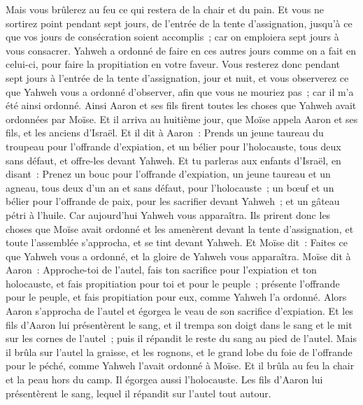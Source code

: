 \begin{multicols}{2}
Mais vous brûlerez au feu ce qui restera de la chair et du pain.
Et vous ne sortirez point pendant sept jours, de l'entrée de la tente d'assignation, jusqu'à ce que vos jours de consécration soient accomplis~; car on emploiera sept jours à vous consacrer.
Yahweh a ordonné de faire en ces autres jours comme on a fait en celui-ci, pour faire la propitiation en votre faveur.
Vous resterez donc pendant sept jours à l'entrée de la tente d'assignation, jour et nuit, et vous observerez ce que Yahweh vous a ordonné d'observer, afin que vous ne mouriez pas~; car il m'a été ainsi ordonné.
Ainsi Aaron et ses fils firent toutes les choses que Yahweh avait ordonnées par Moïse.
\VerseOne{}Et il arriva au huitième jour, que Moïse appela Aaron et ses fils, et les anciens d'Israël.
Et il dit à Aaron~: Prends un jeune taureau du troupeau pour l'offrande d'expiation, et un bélier pour l'holocauste, tous deux sans défaut, et offre-les devant Yahweh.
Et tu parleras aux enfants d'Israël, en disant~: Prenez un bouc pour l'offrande d'expiation, un jeune taureau et un agneau, tous deux d'un an et sans défaut, pour l'holocauste~;
un bœuf et un bélier pour l'offrande de paix, pour les sacrifier devant Yahweh~; et un gâteau pétri à l'huile. Car aujourd'hui Yahweh vous apparaîtra.
Ils prirent donc les choses que Moïse avait ordonné et les amenèrent devant la tente d'assignation, et toute l'assemblée s'approcha, et se tint devant Yahweh.
Et Moïse dit~: Faites ce que Yahweh vous a ordonné, et la gloire de Yahweh vous apparaîtra.
Moïse dit à Aaron~: Approche-toi de l'autel, fais ton sacrifice pour l'expiation et ton holocauste, et fais propitiation pour toi et pour le peuple~; présente l'offrande pour le peuple, et fais propitiation pour eux, comme Yahweh l'a ordonné.
Alors Aaron s'approcha de l'autel et égorgea le veau de son sacrifice d'expiation.
Et les fils d'Aaron lui présentèrent le sang, et il trempa son doigt dans le sang et le mit sur les cornes de l'autel~; puis il répandit le reste du sang au pied de l'autel.
Mais il brûla sur l'autel la graisse, et les rognons, et le grand lobe du foie de l'offrande pour le péché, comme Yahweh l'avait ordonné à Moïse.
Et il brûla au feu la chair et la peau hors du camp.
Il égorgea aussi l'holocauste. Les fils d'Aaron lui présentèrent le sang, lequel il répandit sur l'autel tout autour.

\end{multicols}
